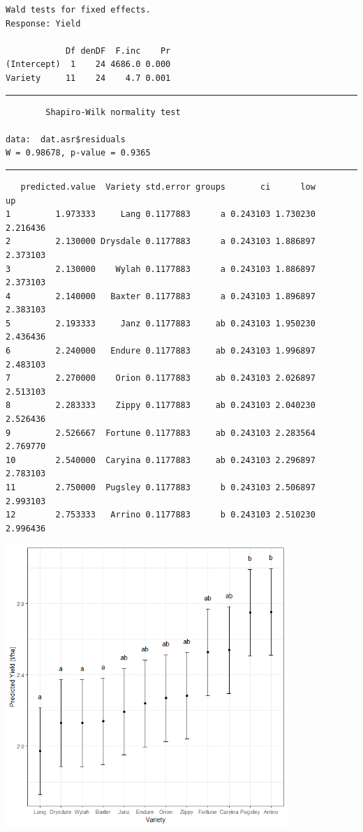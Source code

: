 \documentclass[a4paper, 10pt, fleqn, twosided]{memoir}
\begin{document}
\begin{tcolorbox}[title = Exercise 7 output continued]
\begin{verbatim}
Wald tests for fixed effects.
Response: Yield

            Df denDF  F.inc    Pr
(Intercept)  1    24 4686.0 0.000
Variety     11    24    4.7 0.001
\end{verbatim}
{\color{outpt} {\hrule height 1pt}}
\begin{verbatim}
        Shapiro-Wilk normality test

data:  dat.asr$residuals
W = 0.98678, p-value = 0.9365
\end{verbatim}

{\color{outpt} {\hrule height 1pt}}
\begin{verbatim}
   predicted.value  Variety std.error groups       ci      low       up
1         1.973333     Lang 0.1177883      a 0.243103 1.730230 2.216436
2         2.130000 Drysdale 0.1177883      a 0.243103 1.886897 2.373103
3         2.130000    Wylah 0.1177883      a 0.243103 1.886897 2.373103
4         2.140000   Baxter 0.1177883      a 0.243103 1.896897 2.383103
5         2.193333     Janz 0.1177883     ab 0.243103 1.950230 2.436436
6         2.240000   Endure 0.1177883     ab 0.243103 1.996897 2.483103
7         2.270000    Orion 0.1177883     ab 0.243103 2.026897 2.513103
8         2.283333    Zippy 0.1177883     ab 0.243103 2.040230 2.526436
9         2.526667  Fortune 0.1177883     ab 0.243103 2.283564 2.769770
10        2.540000  Caryina 0.1177883     ab 0.243103 2.296897 2.783103
11        2.750000  Pugsley 0.1177883      b 0.243103 2.506897 2.993103
12        2.753333   Arrino 0.1177883      b 0.243103 2.510230 2.996436
\end{verbatim}
\end{tcolorbox}

\begin{tcolorbox}[title = Exercise 7 output continued]
\includegraphics[width=0.8\textwidth, frame]{Exercise7Pred.png}

\end{tcolorbox}
\end{document}
